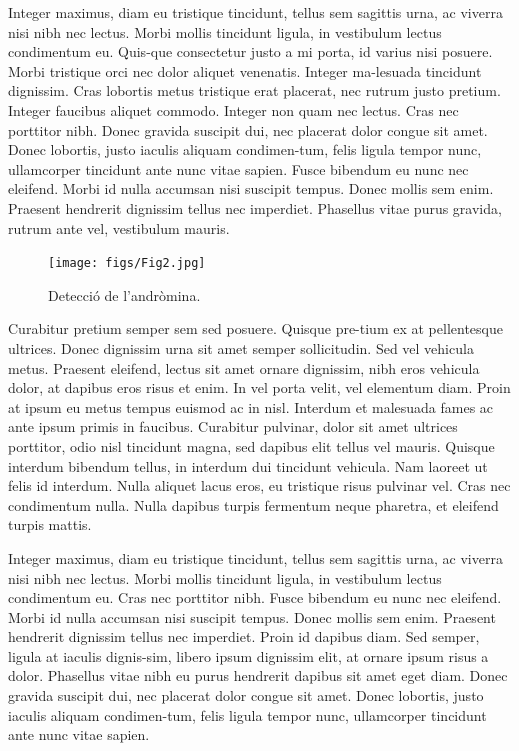 ﻿\documentclass[10pt,a4paper,twocolumn,twoside]{article}
\begin{document}
Integer maximus, diam eu tristique tincidunt, tellus sem sagittis urna, ac viverra nisi nibh nec lectus. Morbi mollis tincidunt ligula, in vestibulum lectus condimentum eu. Quis-que consectetur justo a mi porta, id varius nisi posuere. Morbi tristique orci nec dolor aliquet venenatis. Integer ma-lesuada tincidunt dignissim. Cras lobortis metus tristique erat placerat, nec rutrum justo pretium. Integer faucibus aliquet commodo. Integer non quam nec lectus. Cras nec porttitor nibh. Donec gravida suscipit dui, nec placerat dolor congue sit amet. Donec lobortis, justo iaculis aliquam condimen-tum, felis ligula tempor nunc, ullamcorper tincidunt ante nunc vitae sapien. Fusce bibendum eu nunc nec eleifend. Morbi id nulla accumsan nisi suscipit tempus. Donec mollis sem enim. Praesent hendrerit dignissim tellus nec imperdiet. Phasellus vitae purus gravida, rutrum ante vel, vestibulum mauris.


\begin{figure}[!h]
\centering
	\texttt{[image: figs/Fig2.jpg]}
	\caption{Detecció de l’andròmina.}
	\label{f:detall}
\end{figure}

Curabitur pretium semper sem sed posuere. Quisque pre-tium ex at pellentesque ultrices. Donec dignissim urna sit amet semper sollicitudin. Sed vel vehicula metus. Praesent eleifend, lectus sit amet ornare dignissim, nibh eros vehicula dolor, at dapibus eros risus et enim. In vel porta velit, vel elementum diam. Proin at ipsum eu metus tempus euismod ac in nisl. Interdum et malesuada fames ac ante ipsum primis in faucibus. Curabitur pulvinar, dolor sit amet ultrices porttitor, odio nisl tincidunt magna, sed dapibus elit tellus vel mauris. Quisque interdum bibendum tellus, in interdum dui tincidunt vehicula. Nam laoreet ut felis id interdum. Nulla aliquet lacus eros, eu tristique risus pulvinar vel. Cras nec condimentum nulla. Nulla dapibus turpis fermentum neque pharetra, et eleifend turpis mattis. 

Integer maximus, diam eu tristique tincidunt, tellus sem sagittis urna, ac viverra nisi nibh nec lectus. Morbi mollis tincidunt ligula, in vestibulum lectus condimentum eu. Cras nec porttitor nibh. Fusce bibendum eu nunc nec eleifend. Morbi id nulla accumsan nisi suscipit tempus. Donec mollis sem enim. Praesent hendrerit dignissim tellus nec imperdiet. Proin id dapibus diam. Sed semper, ligula at iaculis dignis-sim, libero ipsum dignissim elit, at ornare ipsum risus a dolor. Phasellus vitae nibh eu purus hendrerit dapibus sit amet eget diam. Donec gravida suscipit dui, nec placerat dolor congue sit amet. Donec lobortis, justo iaculis aliquam condimen-tum, felis ligula tempor nunc, ullamcorper tincidunt ante nunc vitae sapien.
\end{document}
